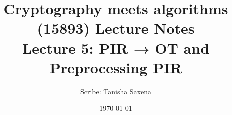 \documentclass[11pt]{article}
\title{{\Large Cryptography meets algorithms (15893) Lecture Notes}\\[5pt]
{\bf Lecture 5: PIR → OT and Preprocessing PIR}}
\author{Scribe: Tanisha Saxena}
\date{\today}
\begin{document}
\maketitle


{

}


\end{document}
